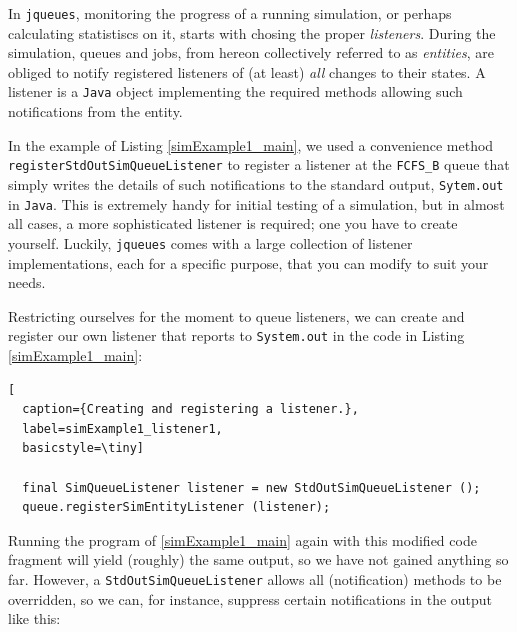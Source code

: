\documentclass[12pt]{book}
\begin{document}
In \lstinline|jqueues|, monitoring the progress of a running simulation,
  or perhaps calculating statistiscs on it,
  starts with chosing the proper {\em listeners}.
During the simulation,
  queues and jobs, from hereon collectively referred to as {\em entities},
  are obliged to notify registered listeners of (at least) {\em all\/}
  changes to their states.
A listener is a \lstinline|Java| object implementing the required methods
  allowing such notifications from the entity.

In the example of Listing \ref{simExample1_main},
  we used a convenience method \lstinline|registerStdOutSimQueueListener|
  to register a listener at the \lstinline|FCFS_B| queue
  that simply writes the details of such notifications
  to the standard output, \lstinline|Sytem.out| in \lstinline|Java|.
This is extremely handy for initial testing of a simulation,
  but in almost all cases,
  a more sophisticated listener is required;
  one you have to create yourself.
Luckily, \lstinline|jqueues| comes with a large collection of
  listener implementations, each for a specific purpose, that
  you can modify to suit your needs.

Restricting ourselves for the moment to queue listeners,
  we can create and register
  our own listener that reports to \lstinline|System.out|
  in the code in Listing \ref{simExample1_main}:

\begin{lstlisting}[
  caption={Creating and registering a listener.},
  label=simExample1_listener1,
  basicstyle=\tiny]

  final SimQueueListener listener = new StdOutSimQueueListener ();
  queue.registerSimEntityListener (listener);

\end{lstlisting}

Running the program of \ref{simExample1_main} again with
  this modified code fragment will yield (roughly)
  the same output, so we have not gained anything so far.
However,
  a \lstinline|StdOutSimQueueListener| allows
  all (notification) methods to be overridden,
  so we can, for instance,
  suppress certain notifications in the output like this:
\end{document}
